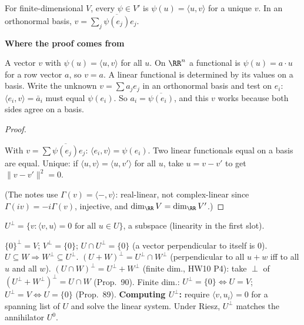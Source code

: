 \documentclass[10pt]{scrartcl}
\newcommand{\ip}[2]{\langle #1,#2\rangle}
\newenvironment{motive}{\begin{mdframed}[style=thinkbox]\textbf{\color{OliveGreen!75!black}Where the proof comes from}\begin{description}[leftmargin=0.9em,labelindent=0pt,itemsep=2pt,topsep=2pt,font=\normalfont\bfseries\color{OliveGreen!70!black}]}{\end{description}\end{mdframed}}
\newenvironment{steps}{\begin{enumerate}[label=\arabic*.,leftmargin=1.5em,itemsep=2pt,topsep=2pt]}{\end{enumerate}}
\begin{document}
\begin{proposition*}
  For finite-dimensional $V$, every $\psi\in V'$ is $\psi(u)=\ip uv$ for a unique $v$. In an orthonormal basis, $v=\sum_j\overline{\psi(e_j)}e_j$.
\end{proposition*}
\begin{motive}
  \ii[Want.] A vector $v$ with $\psi(u)=\ip uv$ for all $u$.
  \ii[Know.] On $\RR^n$ a functional is $\psi(u)=a\cdot u$ for a row vector $a$, so $v=a$. A linear functional is determined by its values on a basis.
   Write the unknown $v=\sum a_je_j$ in an orthonormal basis and test on $e_i$: $\ip{e_i}v=\bar a_i$ must equal $\psi(e_i)$. So $a_i=\overline{\psi(e_i)}$, and this $v$ works because both sides agree on a basis.
\end{motive}
\begin{proof}
  \begin{steps}
    \ii With $v=\sum\overline{\psi(e_j)}e_j$: $\ip{e_i}v=\psi(e_i)$. Two linear functionals equal on a basis are equal.
    \ii Unique: if $\ip uv=\ip u{v'}$ for all $u$, take $u=v-v'$ to get $\|v-v'\|^2=0$.
  \end{steps}
  (The notes use $\Gamma(v)=\ip-v$: real-linear, not complex-linear since $\Gamma(iv)=-i\Gamma(v)$, injective, and $\dim_\RR V=\dim_\RR V'$.)
\end{proof}

\begin{definition*}
  $U^\perp=\{v:\ip vu=0\text{ for all }u\in U\}$, a subspace (linearity in the first slot).
\end{definition*}
\begin{itemize}
  \ii $\{0\}^\perp=V$; $V^\perp=\{0\}$; $U\cap U^\perp=\{0\}$ (a vector perpendicular to itself is $0$).
  \ii $U\subseteq W\Rightarrow W^\perp\subseteq U^\perp$.
  \ii $(U+W)^\perp=U^\perp\cap W^\perp$ (perpendicular to all $u+w$ iff to all $u$ and all $w$).
  \ii $(U\cap W)^\perp=U^\perp+W^\perp$ (finite dim., HW10 P4): take $\perp$ of $(U^\perp+W^\perp)^\perp=U\cap W$ (Prop.~90).
  \ii Finite dim.: $U^\perp=\{0\}\iff U=V$; $U^\perp=V\iff U=\{0\}$ (Prop.~89).
  \ii \textbf{Computing $U^\perp$:} require $\ip v{u_i}=0$ for a spanning list of $U$ and solve the linear system. Under Riesz, $U^\perp$ matches the annihilator $U^0$.
\end{itemize}
\end{document}
